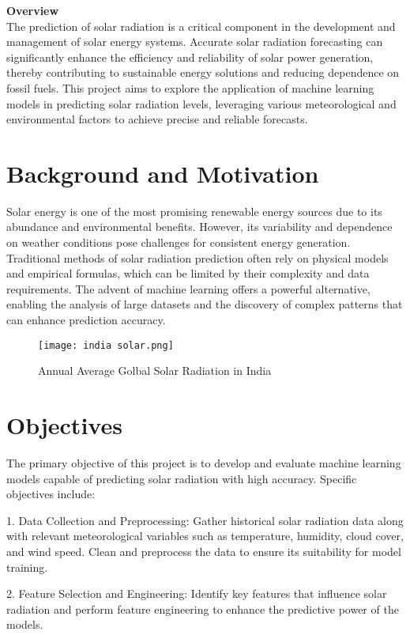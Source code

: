 \documentclass[12pt,a4paper]{report}
\begin{document}
\textbf{Overview}\\
The prediction of solar radiation is a critical component in the development and management of solar energy systems. Accurate solar radiation forecasting can significantly enhance the efficiency and reliability of solar power generation, thereby contributing to sustainable energy solutions and reducing dependence on fossil fuels. This project aims to explore the application of machine learning models in predicting solar radiation levels, leveraging various meteorological and environmental factors to achieve precise and reliable forecasts.

\section{Background and Motivation}

Solar energy is one of the most promising renewable energy sources due to its abundance and environmental benefits. However, its variability and dependence on weather conditions pose challenges for consistent energy generation. Traditional methods of solar radiation prediction often rely on physical models and empirical formulas, which can be limited by their complexity and data requirements. The advent of machine learning offers a powerful alternative, enabling the analysis of large datasets and the discovery of complex patterns that can enhance prediction accuracy.
\begin{figure}[!ht]
    \centering
    \texttt{[image: india solar.png]}
    \caption{Annual Average Golbal Solar Radiation in India}
    \label{fig:enter-label}
\end{figure}
\section{Objectives}

The primary objective of this project is to develop and evaluate machine learning models capable of predicting solar radiation with high accuracy. Specific objectives include:

1. Data Collection and Preprocessing: Gather historical solar radiation data along with relevant meteorological variables such as temperature, humidity, cloud cover, and wind speed. Clean and preprocess the data to ensure its suitability for model training.
   
2. Feature Selection and Engineering: Identify key features that influence solar radiation and perform feature engineering to enhance the predictive power of the models.
   
\end{document}
